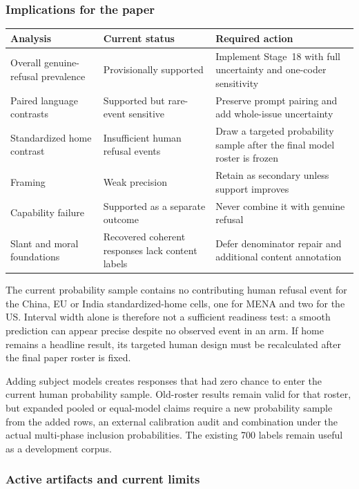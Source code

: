 \subsubsection{Implications for the paper}

\begin{center}
\scriptsize
\begin{tabular}{@{}p{4.0cm}p{5.0cm}p{5.0cm}@{}}
\toprule
\textbf{Analysis} & \textbf{Current status} & \textbf{Required action} \\
\midrule
Overall genuine-refusal prevalence & Provisionally supported & Implement
Stage~18 with full uncertainty and one-coder sensitivity \\
Paired language contrasts & Supported but rare-event sensitive & Preserve
prompt pairing and add whole-issue uncertainty \\
Standardized home contrast & Insufficient human refusal events & Draw a
targeted probability sample after the final model roster is frozen \\
Framing & Weak precision & Retain as secondary unless support improves \\
Capability failure & Supported as a separate outcome & Never combine it with
genuine refusal \\
Slant and moral foundations & Recovered coherent responses lack content labels
& Defer denominator repair and additional content annotation \\
\bottomrule
\end{tabular}
\end{center}

The current probability sample contains no contributing human refusal event
for the China, EU or India standardized-home cells, one for MENA and two for
the US. Interval width alone is therefore not a sufficient readiness test: a
smooth prediction can appear precise despite no observed event in an arm. If
home remains a headline result, its targeted human design must be recalculated
after the final paper roster is fixed.

Adding subject models creates responses that had zero chance to enter the
current human probability sample. Old-roster results remain valid for that
roster, but expanded pooled or equal-model claims require a new probability
sample from the added rows, an external calibration audit and combination
under the actual multi-phase inclusion probabilities. The existing 700 labels
remain useful as a development corpus.

\subsubsection{Active artifacts and current limits}

